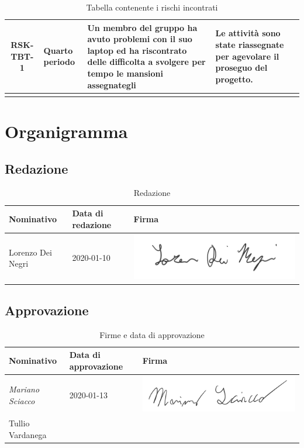 \begin{center}
\begin{longtable}{|c|p{3cm}|p{4cm}|p{4cm}|}
			\hline
			RSK-TBT-1 & Quarto periodo & Un membro del gruppo ha avuto problemi con il suo laptop ed ha riscontrato delle difficolta a svolgere per tempo le mansioni assegnategli & Le attività sono state riassegnate per agevolare il proseguo del progetto. \\
			\hline
			\caption{Tabella contenente i rischi incontrati}
			\end{longtable}
		\end{center}

	\section{Organigramma}
		
		\subsection{Redazione}
			
			\begin{table}[!h]
				\centering
					\begin{tabular}{|l|l|l|}
						\hline
						\textbf{Nominativo} & \textbf{Data di redazione} & \textbf{Firma} \\ \hline
						Lorenzo Dei Negri & 2020-01-10 &  \includegraphics[scale=0.6]{images/firme/lorenzo} \\ \hline
					\end{tabular}
				\caption{Redazione}
			\end{table}
		
		\subsection{Approvazione}
			
			\begin{table}[!h]
				\centering
				\begin{tabular}{|l|l|l|}
					\hline
					\textbf{Nominativo} & \textbf{Data di approvazione} & \textbf{Firma} \\ \hline
					\textit{Mariano Sciacco} & 2020-01-13 &  \includegraphics[scale=0.6]{images/firme/mariano}  \\ \hline
					Tullio Vardanega &  & \\ \hline
				\end{tabular}
				\caption{Firme e data di approvazione}
			\end{table}
			
